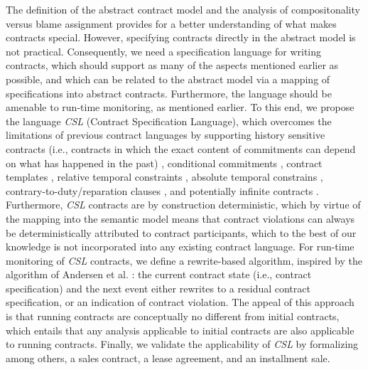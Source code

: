 \documentclass[orivec,final]{llncs-href}
\newcommand{\csl}{\textit{CSL}}
\begin{document}
The definition of the abstract contract model and the analysis of
compositonality versus blame assignment provides for a better
understanding of what makes contracts special. However, specifying
contracts directly in the abstract model is not practical.
Consequently, we need a specification language for writing contracts,
which should support as many of the aspects mentioned earlier as
possible, and which can be related to the abstract model via a mapping
of specifications into 
abstract contracts. Furthermore, the language should be amenable to
run-time monitoring, as mentioned earlier. To this end, we propose the language \csl{} (Contract
Specification Language), which overcomes the limitations of previous
contract languages by supporting history sensitive contracts (i.e.,
contracts in which the exact content of commitments can depend on what
has happened in the past)
\cite{governatori06formalbcl,andersen06contracts}, conditional
commitments
\cite{lee88electroniccontracting,governatori06formalbcl,goodchild00b2b,prisacariu07cl,boulmakoul02integratedcontract},
contract templates \cite{andersen06contracts}, 
relative temporal constraints
\cite{lee88electroniccontracting,governatori06formalbcl,goodchild00b2b,andersen06contracts},
absolute temporal constrains
\cite{lee88electroniccontracting,governatori06formalbcl,goodchild00b2b,andersen06contracts,boulmakoul02integratedcontract},
contrary-to-duty/reparation clauses
\cite{governatori06formalbcl,prisacariu07cl,boulmakoul02integratedcontract},
and potentially infinite contracts
\cite{andersen06contracts,prisacariu07cl}. Furthermore, \csl{}
contracts are by construction deterministic, which by virtue of the
mapping into the semantic model means that contract violations can
always be deterministically attributed to contract participants, which
to the best of our knowledge is not incorporated into any existing
contract language. For run-time monitoring of \csl{} contracts, we
define a rewrite-based algorithm, inspired by the algorithm of
Andersen et al. \cite{andersen06contracts}: the current contract
state (i.e., contract specification) and the next event either
rewrites to a residual contract specification, or an indication of contract
violation. The appeal of this approach is that running contracts are
conceptually no different from initial contracts, which entails that
any analysis applicable to initial contracts are also applicable to
running contracts. Finally, we validate the applicability of \csl{} by
formalizing among others, a sales contract, a lease agreement, and an
installment sale.
\end{document}
